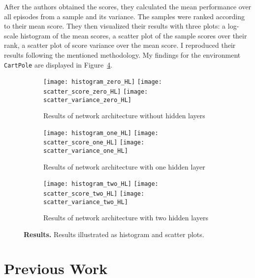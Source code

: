 After the authors obtained the scores, they calculated the mean performance over all episodes from a sample and its variance. The samples were ranked according to their mean score. They then visualized their results with three plots: a log-scale histogram of the mean scores, a scatter plot of the sample scores over their rank, a scatter plot of score variance over the mean score. I reproduced their results following the mentioned methodology. My findings for the environment \verb|CartPole| are displayed in Figure~\ref{fig:plots_reproduced}.

\begin{figure}[ht]
\centering
\begin{subfigure}{\textwidth}
  \centering
  \texttt{[image: histogram\_zero\_HL]}
  \texttt{[image: scatter\_score\_zero\_HL]}
  \texttt{[image: scatter\_variance\_zero\_HL]}
    \caption{Results of network architecture without hidden layers}
    \label{fig:plots_reproduced_first}
\end{subfigure}
\begin{subfigure}{\textwidth}
  \centering
  \texttt{[image: histogram\_one\_HL]}
  \texttt{[image: scatter\_score\_one\_HL]}
  \texttt{[image: scatter\_variance\_one\_HL]}
    \caption{Results of network architecture with one hidden layer}
    \label{fig:plots_reproduced_second}
\end{subfigure}
\begin{subfigure}{\textwidth}
  \centering
  \texttt{[image: histogram\_two\_HL]}
  \texttt{[image: scatter\_score\_two\_HL]}
  \texttt{[image: scatter\_variance\_two\_HL]}
    \caption{Results of network architecture with two hidden layers}
    \label{fig:plots_reproduced_third}
\end{subfigure}
\caption[Reproduced Plots]{
  \textbf{Results.}
  Results illustrated as histogram and scatter plots.
}
\label{fig:plots_reproduced}
\end{figure}





\section{Previous Work}
